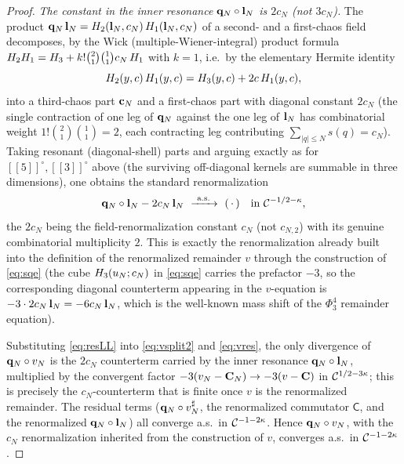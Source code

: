 \begin{proof}
\emph{The constant in the inner resonance $\mathbf{q}_N\circ\mathbf{l}_N$ is $2c_N$ (not $3c_N$).}
The product $\mathbf{q}_N\,\mathbf{l}_N=H_2(\mathbf{l}_N,c_N)\,H_1(\mathbf{l}_N,c_N)$ of a
second- and a first-chaos field decomposes, by the Wick (multiple-Wiener-integral)
product formula $H_2H_1=H_3+k!\binom21\binom11 c_N\,H_1$ with
$k=1$, i.e.\ by the elementary Hermite identity
\begin{equation}\label{eq:He2He1}
H_2(y,c)\,H_1(y,c)=H_3(y,c)+2c\,H_1(y,c),
\end{equation}
into a third-chaos part $\mathbf{c}_N$ and a first-chaos part with diagonal constant
$2c_N$ (the single contraction of one leg of $\mathbf{q}_N$ against the one leg of
$\mathbf{l}_N$ has combinatorial weight $1!\binom21\binom11=2$, each contracting leg
contributing $\sum_{|q|\le N}s(q)=c_N$). Taking resonant (diagonal-shell) parts and
arguing exactly as for $[\![5]\!]^\circ,[\![3]\!]^\circ$ above (the surviving
off-diagonal kernels are summable in three dimensions), one obtains the standard
renormalization
\begin{equation}\label{eq:resLL}
\qoneLsq_N\circ\qoneLin_N-2c_N\,\qoneLin_N\ \xrightarrow{\ \mathrm{a.s.}\ }\ (\,\cdot\,)\quad\text{in }\qoneC^{-1/2-\kappa},
\end{equation}
the $2c_N$ being the field-renormalization constant $c_N$ (not $c_{N,2}$) with its
genuine combinatorial multiplicity $2$. This is exactly the renormalization already
built into the definition of the renormalized remainder $v$ through the construction of
\eqref{eq:sqe} (the cube $H_3(u_N;c_N)$ in \eqref{eq:sqe} carries the prefactor
$-3$, so the corresponding diagonal counterterm appearing in the $v$-equation is
$-3\cdot2c_N\,\mathbf{l}_N=-6c_N\,\mathbf{l}_N$, which is the well-known mass shift of the
$\Phi^4_3$ remainder equation).

Substituting \eqref{eq:resLL} into \eqref{eq:vsplit2} and \eqref{eq:vres}, the only
divergence of $\mathbf{q}_N\circ v_N$ is the $2c_N$ counterterm carried by the inner
resonance $\mathbf{q}_N\circ\mathbf{l}_N$, multiplied by the convergent factor
$-3(v_N-\mathbf{C}_N)\to-3(v-\mathbf{C})$ in $\mathcal{C}^{1/2-3\kappa}$; this is precisely the
$c_N$-counterterm that is finite once $v$ is the renormalized remainder. The residual
terms ($\mathbf{q}_N\circ v_N^\sharp$, the renormalized commutator $\mathsf C$, and the
renormalized $\mathbf{q}_N\circ\mathbf{l}_N$) all converge a.s.\ in $\mathcal{C}^{-1-2\kappa}$.
Hence $\mathbf{q}_N\circ v_N$, with the $c_N$ renormalization inherited from the
construction of $v$, converges a.s.\ in $\mathcal{C}^{-1-2\kappa}$.


\end{proof}
